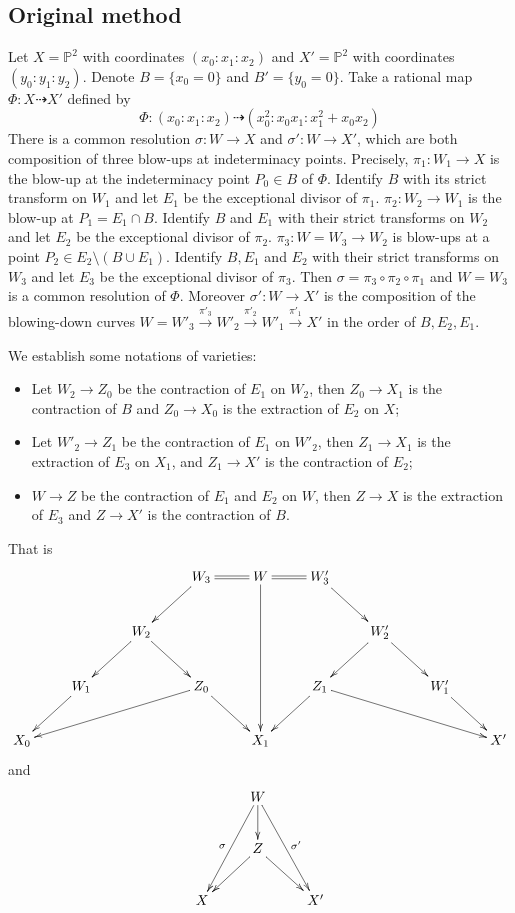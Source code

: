 \documentclass[11pt]{amsart}
\begin{document}
\subsection{Original method}\label{example1}
Let $ X=\mathbb{P}^2 $ with coordinates $ (x_0:x_1:x_2) $ and $ X'=\mathbb{P}^2 $ with coordinates $ (y_0:y_1:y_2) $.
Denote $ B=\{x_0=0\} $ and $B'=\{y_{0}=0\} $.
Take a rational map $ \Phi:X\dashrightarrow X' $ defined by 
\[ \Phi:(x_0:x_1:x_2)\dashrightarrow (x_0^2:x_0x_1:x_1^2+x_0x_2) \]
There is a  common resolution $\sigma:W\to X$ and $\sigma':W\to X'$, which are both composition of three blow-ups at indeterminacy points.
Precisely, $\pi_{1}:W_{1}\to X$ is the blow-up at the indeterminacy point $P_{0} \in B$ of $\Phi$. Identify $B$ with its strict transform on $W_{1}$ and let $E_{1}$ be the exceptional divisor of $\pi_{1}$.
$\pi_{2}:W_{2}\to W_{1}$ is the blow-up at $P_{1}=E_{1} \cap B$. Identify $B$ and $E_{1}$ with their strict transforms on $W_{2}$ and let $E_{2}$ be the exceptional divisor of $\pi_{2}$.
$\pi_{3}:W=W_{3}\to W_{2}$ is blow-ups at a point $P_{2} \in E_{2} \setminus (B\cup E_{1})$. Identify  $B, E_{1}$ and $E_{2}$ with their strict transforms   on $W_{3}$ and let $E_{3}$ be the exceptional divisor of $\pi_{3}$.
Then $ \sigma=\pi_{3}\circ \pi_{2} \circ \pi_{1} $ and $ W=W_3 $ is a common resolution of $\Phi$. Moreover $ \sigma':W\to X' $ is the composition of the blowing-down curves  $W=W'_{3}\xrightarrow{\pi'_{3}} W'_{2}\xrightarrow{\pi'_{2}} W'_{1} \xrightarrow{\pi'_{1}} X'$ in the order of $ B,E_2,E_1 $.

We establish some notations of varieties:
\begin{itemize}
  \item Let $W_{2}\to Z_{0}$ be the contraction of $E_{1}$ on $W_{2}$, then $Z_{0} \to X_{1}$ is the contraction of $B$  and $Z_{0}\to X_{0}$ is the extraction of $E_{2}$ on $X$;
 \item Let $W'_{2}\to Z_{1}$ be the contraction of $E_{1}$ on $W'_{2}$, then $Z_{1} \to X_{1}$ is the extraction of $E_{3}$ on $X_{1}$, and $Z_{1}\to X'$ is the contraction of $E_{2}$;
 \item $W\to Z$ be the contraction of $E_{1}$ and $E_{2}$ on $W$, then $Z\to X$ is the extraction of $E_{3}$ and $Z\to X'$ is the contraction of $B$.
\end{itemize}
That is
    \[ \xymatrix{&&&W_3\ar[ld]\ar@{=}[r]&W\ar[ddd]\ar@{=}[r]&W_3'\ar[rd]\\
      &&W_2\ar[ld]\ar[rd]&&&&W_2'\ar[rd]\ar[dl]\\
      &W_1\ar[ld]&&Z_0\ar[llld]\ar[rd]&&Z_1\ar[ld]\ar[rrrd]&&W_1'\ar[rd]\\
      X_0&&&&X_1&&&&X'
    } \]
    and 
    \[\xymatrix{
      &W\ar[d]\ar[ddl]_{\sigma}\ar[ddr]^{\sigma'}&\\
      &Z\ar[dl]\ar[dr]\\
      X&&X' }  \]
    
\end{document}
